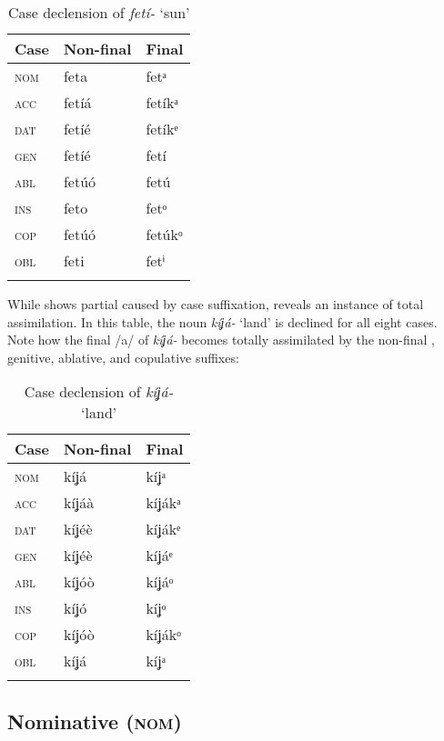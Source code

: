 \begin{table}
\caption{Case declension of \textit{fetí-} ‘sun’}
\label{tab:case:feti}
\begin{tabularx}{.66\textwidth}{XXX}
\lsptoprule
Case & Non-final & Final\\
\midrule
\textsc{nom} & feta & fetᵃ\\
\textsc{acc} & fetíá & fetíkᵃ\\
\textsc{dat} & fetíé & fetíkᵉ\\
\textsc{gen} & fetíé & fetí\\
\textsc{abl} & fetúó & fetú\\
\textsc{ins} & feto & fetᵒ\\
\textsc{cop} & fetúó & fetúkᵒ\\
\textsc{obl} & feti & fetⁱ\\
\lspbottomrule
\end{tabularx}
\end{table}
While  shows partial  caused by case suffixation,  reveals an instance of total assimilation. In this table, the noun \textit{kíʝá-} ‘land’ is declined for all eight cases. Note how the final /a/ of \textit{kíʝá-} becomes totally assimilated by the non-final , genitive, ablative, and copulative suffixes:


\begin{table}
\caption{Case declension of \textit{kíʝá-} ‘land’}
\label{tab:case:kija}
\begin{tabularx}{.66\textwidth}{XXX}
\lsptoprule
Case & Non-final & Final\\
\midrule
\textsc{nom} & kíʝá & kíʝᵃ\\
\textsc{acc} & kíʝáà & kíʝákᵃ\\
\textsc{dat} & kíʝéè & kíʝákᵉ\\
\textsc{gen} & kíʝéè & kíʝáᵉ\\
\textsc{abl} & kíʝóò & kíʝáᵒ\\
\textsc{ins} & kíʝó & kíʝᵒ\\
\textsc{cop} & kíʝóò & kíʝákᵒ\\
\textsc{obl} & kíʝá & kíʝᵃ\\
\lspbottomrule
\end{tabularx}
\end{table}




\subsection{Nominative (\textsc{nom})}\label{sec:7.2}
\largerpage

